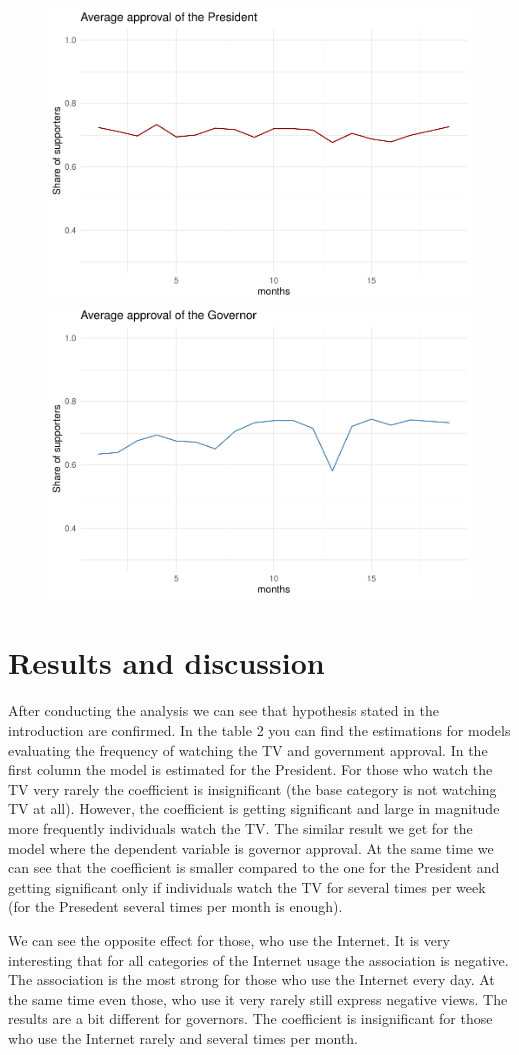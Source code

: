 \documentclass[
  english,
  man]{apa6}
\begin{document}
\begin{figure}[h]
\includegraphics[width=0.5\linewidth,]{Final_paper_files/figure-latex/figures-side-1} \includegraphics[width=0.5\linewidth,]{Final_paper_files/figure-latex/figures-side-2} \caption{ }\label{fig:figures-side}
\end{figure}

\hypertarget{results-and-discussion}{%
\section{Results and discussion}\label{results-and-discussion}}

After conducting the analysis we can see that hypothesis stated in the introduction are confirmed. In the table 2 you can find the estimations for models evaluating the frequency of watching the TV and government approval. In the first column the model is estimated for the President. For those who watch the TV very rarely the coefficient is insignificant (the base category is not watching TV at all). However, the coefficient is getting significant and large in magnitude more frequently individuals watch the TV. The similar result we get for the model where the dependent variable is governor approval. At the same time we can see that the coefficient is smaller compared to the one for the President and getting significant only if individuals watch the TV for several times per week (for the Presedent several times per month is enough).

We can see the opposite effect for those, who use the Internet. It is very interesting that for all categories of the Internet usage the association is negative. The association is the most strong for those who use the Internet every day. At the same time even those, who use it very rarely still express negative views. The results are a bit different for governors. The coefficient is insignificant for those who use the Internet rarely and several times per month.
\end{document}
